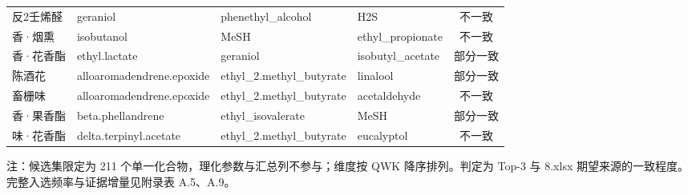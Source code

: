 \documentclass[zihao=-4,a4paper,UTF8,fontset=none]{ctexart}
\begin{document}
\begin{longtable}{@{}p{1.55cm}p{3.35cm}p{3.35cm}p{3.35cm}c@{}}
反2壬烯醛 & geraniol & phenethyl\_alcohol & H2S & 不一致 \\
香·烟熏 & isobutanol & MeSH & ethyl\_propionate & 不一致 \\
香·花香酯 & ethyl.lactate & geraniol & isobutyl\_acetate & 部分一致 \\
陈酒花 & alloaromadendrene.epoxide & ethyl\_2.methyl\_butyrate & linalool & 部分一致 \\
畜栅味 & alloaromadendrene.epoxide & ethyl\_2.methyl\_butyrate & acetaldehyde & 不一致 \\
香·果香酯 & beta.phellandrene & ethyl\_isovalerate & MeSH & 部分一致 \\
味·花香酯 & delta.terpinyl.acetate & ethyl\_2.methyl\_butyrate & eucalyptol & 不一致 \\
\end{longtable}

\noindent\footnotesize 注：候选集限定为 211 个单一化合物，理化参数与汇总列不参与；维度按 QWK 降序排列。判定为 Top-3 与 8.xlsx 期望来源的一致程度。完整入选频率与证据增量见附录表 A.5、A.9。
\end{document}
